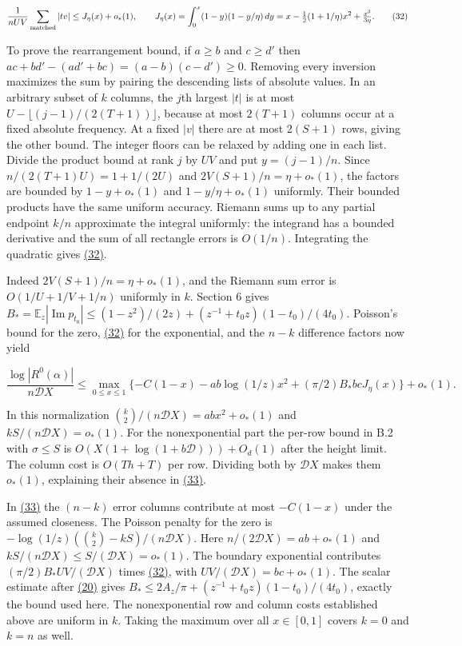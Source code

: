\documentclass[11pt,a4paper]{article}
\newcounter{none}
\begin{document}
\[
 \frac1{nUV}\sum_{\rm matched}|t v|\le J_\eta(x)+o_*(1),\qquad
 J_\eta(x)=\int_0^x(1-y)(1-y/\eta)\,dy
 =x-\tfrac12(1+1/\eta)x^2+\tfrac{x^3}{3\eta}.                            \tag{32}\label{eq:32}
\]

To prove the rearrangement bound, if \(a\ge b\) and \(c\ge d'\) then \(ac+bd'-(ad'+bc)=(a-b)(c-d')\ge0\). Removing every inversion maximizes the sum by pairing the descending lists of absolute values. In an arbitrary subset of \(k\) columns, the \(j\)th largest \(|t|\) is at most \(U-\lfloor(j-1)/(2(T+1))\rfloor\), because at most \(2(T+1)\) columns occur at a fixed absolute frequency. At a fixed \(|v|\) there are at most \(2(S+1)\) rows, giving the other bound. The integer floors can be relaxed by adding one in each list. Divide the product bound at rank \(j\) by \(UV\) and put \(y=(j-1)/n\). Since \(n/(2(T+1)U)=1+1/(2U)\) and \(2V(S+1)/n=\eta+o_*(1)\), the factors are bounded by \(1-y+o_*(1)\) and \(1-y/\eta+o_*(1)\) uniformly. Their bounded products have the same uniform accuracy. Riemann sums up to any partial endpoint \(k/n\) approximate the integral uniformly: the integrand has a bounded derivative and the sum of all rectangle errors is \(O(1/n)\). Integrating the quadratic gives \hyperref[eq:32]{(32)}.

Indeed \(2V(S+1)/n=\eta+o_*(1)\), and the Riemann sum error is \(O(1/U+1/V+1/n)\) uniformly in \(k\). Section 6 gives \(B_*=\mathbb E_z|\operatorname{Im}p_{t_0}|\le(1-z^2)/(2z)+(z^{-1}+t_0z)(1-t_0)/(4t_0)\). Poisson's bound for the zero, \hyperref[eq:32]{(32)} for the exponential, and the \(n-k\) difference factors now yield

\[
 \frac{\log|R^0(\alpha)|}{n\mathscr D X}\le
 \max_{0\le x\le1}
 \{-C(1-x)-ab\log(1/z)x^2+(\pi/2)B_*bcJ_\eta(x)\}+o_*(1).               \tag{33}\label{eq:33}
\]

In this normalization \(\binom{k}{2}/(n\mathscr D X)=abx^2+o_*(1)\) and \(kS/(n\mathscr D X)=o_*(1)\). For the nonexponential part the per-row bound in B.2 with \(\sigma\le S\) is \(O(X(1+\log(1+b\mathscr D)))+O_d(1)\) after the height limit. The column cost is \(O(Th+T)\) per row. Dividing both by \(\mathscr D X\) makes them \(o_*(1)\), explaining their absence in \hyperref[eq:33]{(33)}.

In \hyperref[eq:33]{(33)} the \((n-k)\) error columns contribute at most \(-C(1-x)\) under the assumed closeness. The Poisson penalty for the zero is \(-\log(1/z)(\binom k2-kS)/(n\mathscr D X)\). Here \(n/(2\mathscr D X)=ab+o_*(1)\) and \(kS/(n\mathscr D X)\le S/(\mathscr D X)=o_*(1)\). The boundary exponential contributes \((\pi/2)B_*UV/(\mathscr D X)\) times \hyperref[eq:32]{(32)}, with \(UV/(\mathscr D X)=bc+o_*(1)\). The scalar estimate after \hyperref[eq:20]{(20)} gives \(B_*\le2A_z/\pi+(z^{-1}+t_0z)(1-t_0)/(4t_0)\), exactly the bound used here. The nonexponential row and column costs established above are uniform in \(k\). Taking the maximum over all \(x\in[0,1]\) covers \(k=0\) and \(k=n\) as well.
\end{document}
